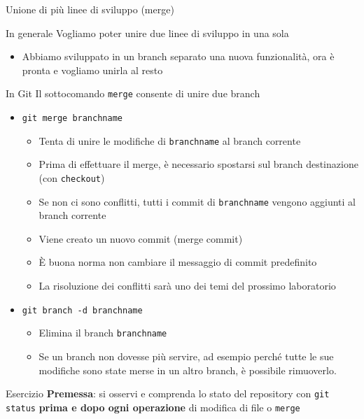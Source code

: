 \documentclass[xcolor=dvipsnames,presentation]{beamer}
\begin{document}
\begin{frame}{Unione di più linee di sviluppo (merge)}
    \begin{block}{In generale}
        Vogliamo poter unire due linee di sviluppo in una sola
        \begin{itemize}
            \item Abbiamo sviluppato in un branch separato una nuova funzionalità, ora è pronta e vogliamo unirla al resto
        \end{itemize}
    \end{block}
    \begin{block}{In Git}
        Il sottocomando \texttt{merge} consente di unire due branch
        \begin{itemize}
            \item \texttt{git merge branchname}
            \begin{itemize}
                \item Tenta di unire le modifiche di \texttt{branchname} al branch corrente
                \item Prima di effettuare il merge, è necessario spostarsi sul branch destinazione (con \texttt{checkout})
                \item Se non ci sono conflitti, tutti i commit di \texttt{branchname} vengono aggiunti al branch corrente
                \item Viene creato un nuovo commit (merge commit)
                \item È buona norma non cambiare il messaggio di commit predefinito
                \item La risoluzione dei conflitti sarà uno dei temi del prossimo laboratorio
            \end{itemize}
            \item \texttt{git branch -d branchname}
            \begin{itemize}
                \item Elimina il branch \texttt{branchname}
                \item Se un branch non dovesse più servire, ad esempio perché tutte le sue modifiche sono state merse in un altro branch, è possibile rimuoverlo.
            \end{itemize}
        \end{itemize}
    \end{block}
    \begin{block}{Esercizio}
        \textbf{Premessa}: si osservi e comprenda lo stato del repository con \texttt{git status} \textbf{prima e dopo ogni operazione} di modifica di file o \texttt{merge}

\end{block}
\end{frame}
\end{document}
